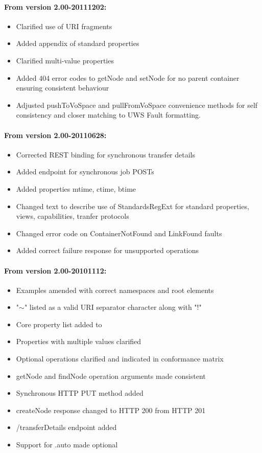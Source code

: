 \documentclass[11pt,a4paper]{ivoa}
\begin{document}
\paragraph{From version 2.00-20111202:}
\begin{itemize}
    \item Clarified use of URI fragments
    \item Added appendix of standard properties
    \item Clarified multi-value properties
    \item Added 404 error codes to getNode and setNode for no parent container ensuring consistent behaviour
    \item Adjusted pushToVoSpace and pullFromVoSpace convenience methods for self consistency and closer matching to UWS Fault formatting.
\end{itemize}

\paragraph{From version 2.00-20110628:}
\begin{itemize}
    \item Corrected REST binding for synchronous transfer details
    \item Added endpoint for synchronous job POSTs
    \item Added properties mtime, ctime, btime
    \item Changed text to describe use of StandardsRegExt for standard properties, views, capabilities, tranfer protocols
    \item Changed error code on ContainerNotFound and LinkFound faults
    \item Added correct failure response for unsupported operations
\end{itemize}

\paragraph{From version 2.00-20101112:}
\begin{itemize}
    \item Examples amended with correct namespaces and root elements
    \item "$\mathtt{\sim}$" listed as a valid URI separator character along with "!"
    \item Core property list added to
    \item Properties with multiple values clarified
    \item Optional operations clarified and indicated in conformance matrix
    \item getNode and findNode operation arguments made consistent
    \item Synchronous HTTP PUT method added
    \item createNode response changed to HTTP 200 from HTTP 201
    \item /{transferDetails} endpoint added
    \item Support for .auto made optional
\end{itemize}
\end{document}
